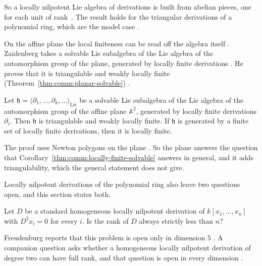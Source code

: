 So a locally nilpotent Lie algebra of derivations is built from abelian
pieces, one for each unit of rank~\cite[p.~2]{PetravchukShevchykSysak2017}. The result holds for the triangular
derivations of a polynomial ring, which are the model case
\cite[p.~2]{PetravchukShevchykSysak2017}.

On the affine plane the local finiteness can be read off the algebra itself
\cite[p.~1]{Zaidenberg2026LocallyFinite}. Zaidenberg takes a solvable Lie
subalgebra of the Lie algebra of the automorphism group of the plane,
generated by locally finite derivations
\cite[p.~1]{Zaidenberg2026LocallyFinite}. He proves that it is triangulable
and weakly locally finite (Theorem~\ref{thm:comm:planar-solvable})
\cite[Theorem~1.2,
p.~2]{Zaidenberg2026LocallyFinite}.\begin{theorem}\label{thm:comm:planar-solvable} Let
$\mathfrak{h}=\langle\partial_{1},\dots,\partial_{k},\dots\rangle_{\mathrm{Lie}}$
be a solvable Lie subalgebra of the Lie algebra of the automorphism group of
the affine plane $\mathbb{A}^{2}$, generated by locally finite derivations
$\partial_{i}$. Then $\mathfrak{h}$ is triangulable and weakly locally finite.
If $\mathfrak{h}$ is generated by a finite set of locally finite derivations,
then it is locally finite. \end{theorem}

The proof uses Newton polygons on the plane
\cite[pp.~10--16]{Zaidenberg2026LocallyFinite}. So the plane answers the
question that Corollary~\ref{thm:comm:locally-finite-solvable} answers in
general, and it adds triangulability, which the general statement does not
give.

Locally nilpotent derivations of the polynomial ring also leave two questions
open, and this section states both.

\begin{problem}\label{prob:open:hdp}
Let $D$ be a standard homogeneous locally nilpotent derivation of
$k[x_1,\dots,x_n]$ with $D^2x_i=0$ for every $i$.
Is the rank of $D$ always strictly less than $n$?
\end{problem}

Freudenburg reports that this problem is open only in dimension $5$
\cite[p.~108]{Freudenburg2017}. A companion question asks whether a
homogeneous locally nilpotent derivation of degree two can have full rank, and
that question is open in every dimension \cite[Remark~3.51,
p.~112]{Freudenburg2017}.

